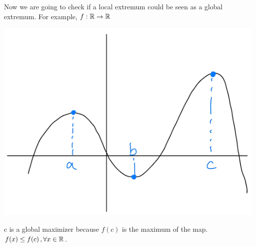 Now we are going to check if a local extremum could be seen as a global extremum. For example, $f: \mathbb{R}\to\mathbb{R}$
\begin{center}
    \includegraphics[scale=0.5]{Images/27.png}
\end{center}
c is a global maximizer because $f(c)$ is the maximum of the map. $f(x)\leq f(c)\, ,\forall x\in\mathbb{R}$.\\

